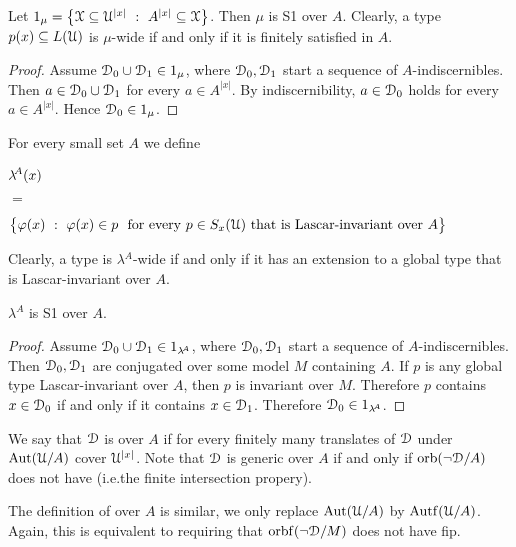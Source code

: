 \documentclass{amsproc}
\renewcommand*{\emph}[1]{%
   \smash{\tikz[baseline]\node[rectangle, fill=teal!25, rounded corners, inner xsep=0.5ex, inner ysep=0.2ex, anchor=base, minimum height = 2.7ex]{\strut #1};}}
\begin{document}
\begin{example}\label{ex_mu_fin_sat}
  Let $1_\mu=\big\{\EuScript X\subseteq\EuScript U^{|x|}\ :\ A^{|x|}\subseteq\EuScript X\big\}$.
  Then $\mu$ is S1 over $A$.
  Clearly, a type $p(x)\subseteq L(\EuScript U)$ is $\mu$-wide if and only if it is finitely satisfied in $A$.
\end{example}

\begin{proof} 
  Assume $\EuScript D_0\cup\EuScript D_1\in1_\mu$, where $\EuScript D_0,\EuScript D_1$ start a sequence of $A$-indiscernibles.
  Then $a\in\EuScript D_0\cup\EuScript D_1$ for every $a\in A^{|x|}$.
  By indiscernibility, $a\in\EuScript D_0$ holds for every $a\in A^{|x|}$.
  Hence $\EuScript D_0\in1_\mu$.
\end{proof}

For every small set $A$ we define

{\def\ceq#1#2#3{\parbox[t]{10ex}{$\displaystyle #1$}\parbox{6ex}{\hfil $#2$}{$\displaystyle #3$}}
\ceq{\hfill\lambda\!^A(x)}{=}{\big\{\varphi(x)\ :\ \varphi(x)\in p\ {\rm\ for\ every\ }p\in S_x(\EuScript U)\ \textrm{that is Lascar-invariant over}\ A\big\}}}

Clearly, a type is $\lambda\!^A$-wide if and only if it has an extension to a global type that is Lascar-invariant over $A$.

\begin{lemma}
  $\lambda\!^A$ is S1 over $A$.
\end{lemma}  

\begin{proof}
  Assume $\EuScript D_0\cup\EuScript D_1\in1_{\lambda\!^A}$, where $\EuScript D_0,\EuScript D_1$ start a sequence of $A$-indiscernibles.
  Then $\EuScript D_0,\EuScript D_1$ are conjugated over some model $M$ containing $A$.
  If $p$ is any global type Lascar-invariant over $A$, then $p$ is invariant over $M$.
  Therefore $p$ contains $x\in\EuScript D_0$ if and only if it contains $x\in\EuScript D_1$.
  Therefore $\EuScript D_0\in1_{\lambda\!^A}$.
\end{proof}

We say that $\EuScript D$ is \emph{generic\/} over $A$ if for every finitely many translates of $\EuScript D$ under ${\rm Aut}(\EuScript U/A)$ cover $\EuScript U^{|x|}$.
Note that $\EuScript D$ is generic over $A$ if and only if  ${\rm orb}(\neg\EuScript D/A)$ does not have \emph{fip\/} (i.e.\@ the finite intersection propery).

The definition of \emph{Lascar-generic\/} over $A$ is similar, we only replace ${\rm Aut}(\EuScript U/A)$ by ${\rm Autf}(\EuScript U/A)$.
Again, this is equivalent to requiring that ${\rm orbf}(\neg\EuScript D/M)$ does not have fip.
\end{document}
